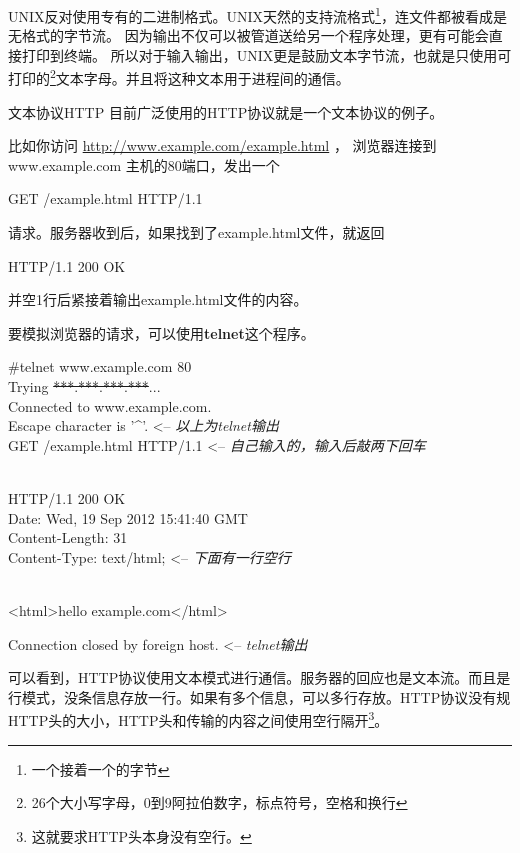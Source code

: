 UNIX反对使用专有的二进制格式。UNIX天然的支持流格式\footnote{一个接着一个的字节}，连文件都被看成是无格式的字节流。
因为输出不仅可以被管道送给另一个程序处理，更有可能会直接打印到终端。
所以对于输入输出，UNIX更是鼓励文本字节流，也就是只使用可打印的\footnote{26个大小写字母，0到9阿拉伯数字，标点符号，空格和换行}文本字母。并且将这种文本用于进程间的通信。

\begin{example}{文本协议HTTP}
目前广泛使用的HTTP协议就是一个文本协议的例子。

比如你访问 \url{http://www.example.com/example.html} ， 浏览器连接到 www.example.com 主机的80端口，发出一个
\begin{code}
GET /example.html HTTP/1.1
\end{code}
请求。服务器收到后，如果找到了example.html文件，就返回
\begin{code}
HTTP/1.1 200 OK
\end{code}
并空1行后紧接着输出example.html文件的内容。

要模拟浏览器的请求，可以使用\textbf{telnet}这个程序。
\begin{code}
\#telnet  www.example.com 80\\
Trying \st{***.***.***.***}...\\
Connected to www.example.com.\\
Escape character is '\textasciicircum'.{ <--  \it 以上为telnet输出 }\\
GET /example.html HTTP/1.1 { <--  \it 自己输入的，输入后敲两下回车 }

\\

HTTP/1.1 200 OK\\
Date: Wed, 19 Sep 2012 15:41:40 GMT\\
Content-Length: 31\\
Content-Type: text/html; {  <-- \it 下面有一行空行}

\\

<html>hello example.com</html>

Connection closed by foreign host. <-- \it telnet输出
\end{code}

可以看到，HTTP协议使用文本模式进行通信。服务器的回应也是文本流。而且是行模式，没条信息存放一行。如果有多个信息，可以多行存放。HTTP协议没有规HTTP头的大小，HTTP头和传输的内容之间使用空行隔开\footnote{这就要求HTTP头本身没有空行。}。

\end{example}

